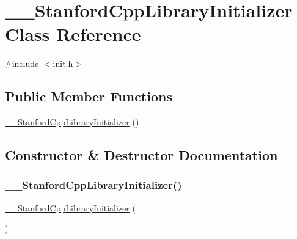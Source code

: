\hypertarget{classstanfordcpplib_1_1____StanfordCppLibraryInitializer}{}\section{\+\_\+\+\_\+\+Stanford\+Cpp\+Library\+Initializer Class Reference}
\label{classstanfordcpplib_1_1____StanfordCppLibraryInitializer}


{\ttfamily \#include $<$init.\+h$>$}

\subsection*{Public Member Functions}
\begin{DoxyCompactItemize}
\item 
\mbox{\hyperlink{classstanfordcpplib_1_1____StanfordCppLibraryInitializer_ac5c5e49047ac854db1577ac4b70f3be1}{\+\_\+\+\_\+\+Stanford\+Cpp\+Library\+Initializer}} ()
\end{DoxyCompactItemize}


\subsection{Constructor \& Destructor Documentation}
\mbox{\label{classstanfordcpplib_1_1____StanfordCppLibraryInitializer_ac5c5e49047ac854db1577ac4b70f3be1}} 
\subsubsection{\texorpdfstring{\+\_\+\+\_\+\+Stanford\+Cpp\+Library\+Initializer()}{\_\_StanfordCppLibraryInitializer()}}
{\footnotesize\ttfamily \mbox{\hyperlink{classstanfordcpplib_1_1____StanfordCppLibraryInitializer}{\+\_\+\+\_\+\+Stanford\+Cpp\+Library\+Initializer}} (\begin{DoxyParamCaption}{ }\end{DoxyParamCaption})\hspace{0.3cm}{\ttfamily [inline]}}

